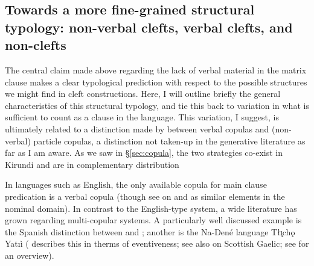 \documentclass[12pt]{article}
\begin{document}
\subsection{Towards a more fine-grained structural typology: non-verbal clefts, verbal clefts, and non-clefts} \label{sec:typology}

The central claim made above regarding the lack of verbal material in the matrix clause makes a clear typological prediction with respect to the possible structures we might find in cleft constructions. Here, I will outline briefly the general characteristics of this structural typology, and tie this back to variation in what is sufficient to count as a clause in the language. This variation, I suggest, is ultimately related to a distinction made by \citet{pustet-2003} between verbal copulas and (non-verbal) particle copulas, a distinction not taken-up in the generative literature as far as I am aware. As we saw in \S\ref{sec:copula}, the two strategies co-exist in Kirundi and are in complementary distribution

In languages such as English, the only available copula for main clause predication is a verbal copula  (though see \citealt{den-dikken-2006} on  and  as similar elements in the nominal domain). In contrast to the English-type system, a wide literature has grown regarding multi-copular systems. A particularly well discussed example is the Spanish distinction between  and ; another is the Na-Dené language Tłı̨chǫ Yatıì (\citealt{welch-2012} describes this in therms of eventiveness; see also \citealt{adger-ramchand-2003} on Scottish Gaelic; see \citealt{gibson-et-al-2019} for an overview). 

\bex
\ex {}
\bxl
{}
\fxl
\ex {}
\bxl
{}
\fxl
\fex
\end{document}
